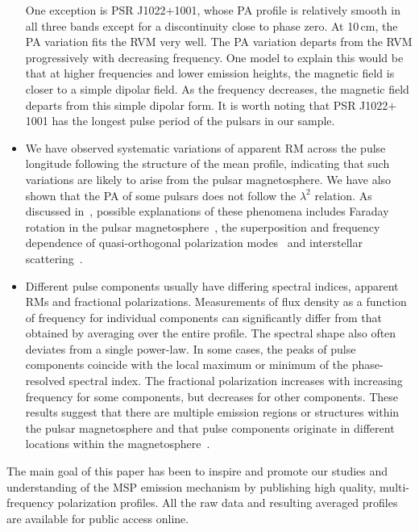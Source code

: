 \documentclass[useAMS,usenatbib]{mn2e}
\begin{document}
\begin{itemize}
	One exception is PSR J1022$+$1001, whose PA profile is relatively smooth in all three bands 
	except for a discontinuity close to phase zero. At 10\,cm, the PA variation fits the RVM very 
	well. The PA variation departs from the RVM progressively with decreasing frequency. One model to explain 
	this would be that at higher frequencies and lower emission heights, the magnetic field is 
	closer to a simple dipolar field. As the frequency decreases, the magnetic field departs from 
	this simple dipolar form. It is worth noting that PSR J1022$+$1001 has the longest pulse period of 
	the pulsars in our sample.
	
	
\item We have observed systematic variations of apparent RM across the pulse longitude following the 
	structure of the mean profile, indicating that such variations are likely to arise from the 
	pulsar magnetosphere. We have also shown that the PA of some pulsars does not follow the $\lambda^2$ 
	relation. As discussed in~\citet{Noutsos09}, possible explanations of these phenomena includes Faraday 
	rotation in the pulsar magnetosphere~\citep{Kennett98,Wang11}, the superposition and frequency 
	dependence of quasi-orthogonal polarization modes~\citep{Ramach04} and interstellar scattering~\citep{Kara09}.

\item	Different pulse components usually have differing spectral indices, apparent RMs and fractional 
	polarizations. Measurements of flux density as a function of frequency for individual components can 
	significantly differ from that obtained by averaging over the entire profile. The spectral shape also 
	often	deviates from a single power-law. In some cases, the peaks of pulse components coincide with 
	the local maximum or minimum of the phase-resolved spectral index. The fractional polarization increases 
	with increasing frequency for some components, but decreases for other components. These results suggest 
	that there are multiple emission regions or structures within the pulsar magnetosphere and that pulse 
	components originate in different locations within the magnetosphere~\citep[e.g.,][]{Dyks10}. 

\end{itemize}

%
The main goal of this paper has been to inspire and promote our studies and understanding 
of the MSP emission mechanism by publishing high quality, multi-frequency 
polarization profiles.
%
All the raw data and resulting averaged profiles are available for 
public access online.
%
\end{document}
